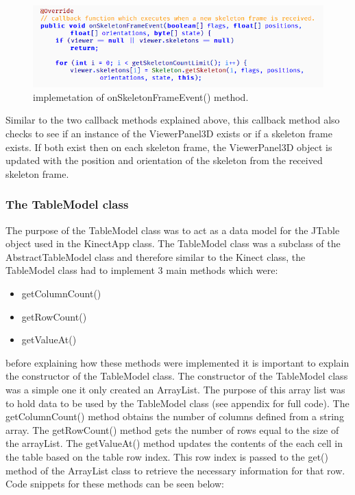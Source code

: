 \documentclass[a4paper, 12pt]{article}
\begin{document}
\begin{figure}[!htb]
	\begin{center}
  \includegraphics[scale=0.75]{codesnippet8.png}
  	\caption{implemetation of onSkeletonFrameEvent() method.}
  \end{center} 
  \label{fig: codesnippet7} 
\end{figure}

Similar to the two callback methods explained above, this callback method also checks to see if an instance of the ViewerPanel3D exists or if a skeleton frame exists. If both exist then on each skeleton frame, the ViewerPanel3D object is updated with the position and orientation of the skeleton from the received skeleton frame.  

\subsubsection{The TableModel class}

The purpose of the TableModel class was to act as a data model for the JTable object used in the KinectApp class. The TableModel class was a subclass of the AbstractTableModel class and therefore similar to the Kinect class, the TableModel class had to implement 3 main methods which were: 

\begin{itemize}
 \item getColumnCount()
 \item getRowCount()
 \item getValueAt()
\end{itemize} 

before explaining how these methods were implemented it is important to explain the constructor of the TableModel class. The constructor of the TableModel class was a simple one it only created an ArrayList. The purpose of this array list was to hold data to be used by the TableModel class (see appendix for full code). The getColumnCount() method obtains the number of columns defined from a string array. The getRowCount() method gets the number of rows equal to the size of the arrayList. The getValueAt() method updates the contents of the each cell in the table based on the table row index. This row index is passed to the get() method of the ArrayList class to retrieve the necessary information for that row. Code snippets for these methods can be seen below: 
\end{document}
